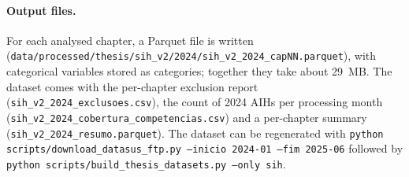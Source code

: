 \paragraph{Output files.}
For each analysed chapter, a Parquet file is written
(\texttt{data/processed/thesis/sih\_v2/2024/sih\_v2\_2024\_capNN.parquet}), with
categorical variables stored as categories; together they take about 29~MB.
The dataset comes with the per-chapter exclusion report
(\texttt{sih\_v2\_2024\_exclusoes.csv}), the count of 2024 AIHs per processing
month (\texttt{sih\_v2\_2024\_cobertura\_competencias.csv}) and a per-chapter
summary (\texttt{sih\_v2\_2024\_resumo.parquet}). The dataset can be regenerated
with \texttt{python scripts/download\_datasus\_ftp.py --inicio 2024-01 --fim 2025-06}
followed by \texttt{python scripts/build\_thesis\_datasets.py --only sih}.
